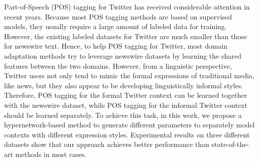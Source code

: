 Part-of-Speech (POS) tagging for Twitter has received considerable attention in recent years. Because most POS tagging methods are based on supervised models, they usually require a large amount of labeled data for training. However, the existing labeled datasets for Twitter are much smaller than those for newswire text. Hence, to help POS tagging for Twitter, most domain adaptation methods try to leverage newswire datasets by learning the shared features between the two domains. However, from a linguistic perspective, Twitter users not only tend to mimic the formal expressions of traditional media, like news, but they also appear to be developing linguistically informal styles. Therefore, POS tagging for the formal Twitter context can be learned together with the newswire dataset, while POS tagging for the informal Twitter context should be learned separately. To achieve this task, in this work, we propose a hypernetwork-based method to generate different parameters to separately model contexts with different expression styles. Experimental results on three different datasets show that our approach achieves better performance than state-of-the-art methods in most cases.
